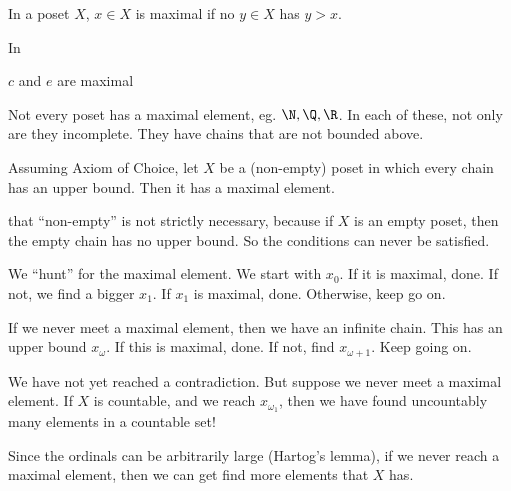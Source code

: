 \documentclass[a4paper]{article}
\begin{document}
\begin{defi}
  In a poset $X$, $x\in X$ is maximal if no $y\in X$ has $y > x$.
\end{defi}

\begin{eg}
  In
  \begin{center}
  \end{center}
  $c$ and $e$ are maximal
\end{eg}

Not every poset has a maximal element, eg. $\N, \Q, \R$. In each of these, not only are they incomplete. They have chains that are not bounded above.

\begin{thm}
  Assuming Axiom of Choice, let $X$ be a (non-empty) poset in which every chain has an upper bound. Then it has a maximal element.
\end{thm}
\note that ``non-empty'' is not strictly necessary, because if $X$ is an empty poset, then the empty chain has no upper bound. So the conditions can never be satisfied.

We ``hunt'' for the maximal element. We start with $x_0$. If it is maximal, done. If not, we find a bigger $x_1$. If $x_1$ is maximal, done. Otherwise, keep go on.

If we never meet a maximal element, then we have an infinite chain. This has an upper bound $x_\omega$. If this is maximal, done. If not, find $x_{\omega + 1}$. Keep going on.

We have not yet reached a contradiction. But suppose we never meet a maximal element. If $X$ is countable, and we reach $x_{\omega_1}$, then we have found uncountably many elements in a countable set!

Since the ordinals can be arbitrarily large (Hartog's lemma), if we never reach a maximal element, then we can get find more elements that $X$ has.
\end{document}
